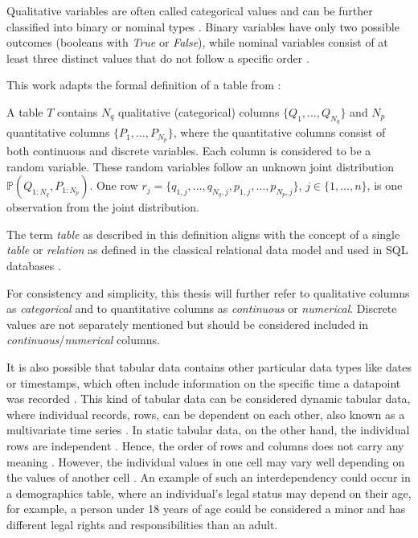 Qualitative variables are often called categorical values and can be further classified into binary or nominal types \cite{lane2003IntroductionStatistics}.
Binary variables have only two possible outcomes (\eg booleans with \textit{True} or \textit{False}), while nominal variables consist of at least three distinct values that do not follow a specific order \cite{lederrey2022DATGANIntegratingExperta, lane2003IntroductionStatistics}.

\newpage
This work adapts the formal definition of a table from \cite{xu2019ModelingTabularData}:

\begin{displayquote}
A table \textbf{$T$} contains $N_q$ qualitative (categorical) columns $\{Q_1, \dots, Q_{N_q}\}$ and $N_p$ quantitative columns $\{P_1, \dots, P_{N_p}\}$, 
where the quantitative columns consist of both continuous and discrete variables. 
Each column is considered to be a random variable. 
These random variables follow an unknown joint distribution $\mathbb{P}(Q_{1:N_q}, P_{1:N_p})$. 
One row $r_j = \{q_{1,j}, \dots, q_{N_q,j}, p_{1,j}, \dots, p_{N_p,j}\}$, $j \in \{1, \dots, n\}$, is one observation from the joint distribution.
\end{displayquote}

The term \textit{table} as described in this definition aligns with the concept of a single \textit{table} or \textit{relation} as defined in the classical relational data model \cite{codd1970RelationalModelData} and used in SQL databases \cite{w.eembley2009RelationalModel}.

For consistency and simplicity, this thesis will further refer to qualitative columns as \textit{categorical} and to quantitative columns as \textit{continuous} or \textit{numerical}. 
Discrete values are not separately mentioned but should be considered included in \textit{continuous}/\textit{numerical} columns.

It is also possible that tabular data contains other particular data types like dates or timestamps, which often include information on the specific time a datapoint was recorded \cite{hernandez2022SyntheticDataGeneration}.
This kind of tabular data can be considered dynamic tabular data, where individual records, \ie rows, can be dependent on each other, also known as a multivariate time series \cite{padhi2021TabularTransformersModeling}.
In static tabular data, on the other hand, the individual rows are independent \cite{padhi2021TabularTransformersModeling}.
Hence, the order of rows and columns does not carry any meaning \cite{somepalli2021SAINTImprovedNeural}.
However, the individual values in one cell may vary well depending on the values of another cell \cite{lederrey2022DATGANIntegratingExperta}.
An example of such an interdependency could occur in a demographics table, where an individual's legal status may depend on their age, 
for example, a person under 18 years of age could be considered a minor and has different legal rights and responsibilities than an adult.


